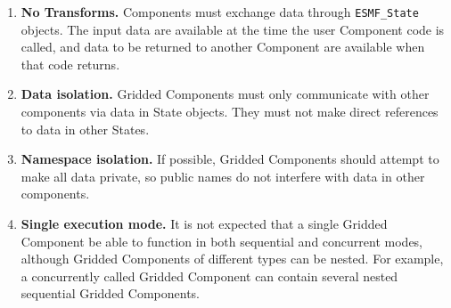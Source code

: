 %


\begin{enumerate}

\item {\bf No Transforms.}  Components must exchange data through   
{\tt ESMF\_State} objects.  The input data are available at the time 
the user Component code is called, and data to be returned to another 
Component are available when that code returns.  

\item {\bf Data isolation.} 
Gridded Components must only communicate with other
components via data in State objects.  They must 
not make direct references to data in other States.

\item {\bf Namespace isolation.}
If possible, Gridded Components should attempt to make 
all data private, so public names do not interfere with data 
in other components.

\item {\bf Single execution mode.}
It is not expected that a single Gridded Component be able 
to function in both sequential and concurrent modes, although 
Gridded Components of different types can be nested. For example,
a concurrently called Gridded Component can contain several nested 
sequential Gridded Components. 

\end{enumerate}
